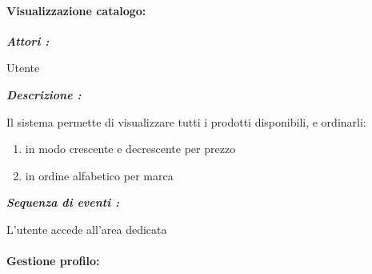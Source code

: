 \documentclass{article}
\begin{document}
\newpage

\paragraph{Visualizzazione catalogo:}

\begin{mdframed}
	\noindent\textit{\textbf{Attori :}}


	Utente

	\noindent\textit{\textbf{Descrizione :}}


	Il sistema permette di visualizzare tutti i prodotti disponibili, e ordinarli:
	\begin{enumerate}
		\item in modo crescente e decrescente per prezzo
		\item in ordine alfabetico per marca
	\end{enumerate}

	\noindent\textit{\textbf{Sequenza di eventi :}}


	L’utente accede all'area dedicata

\end{mdframed}

\paragraph{Gestione profilo:}
\end{document}
